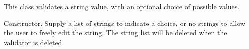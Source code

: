 \section{}\label{wxstringlistvalidator}

This class validates a string value, with an optional choice of possible values.






Constructor. Supply a list of strings to indicate a choice, or no strings to allow the
user to freely edit the string. The string list will be deleted when the validator is deleted.


